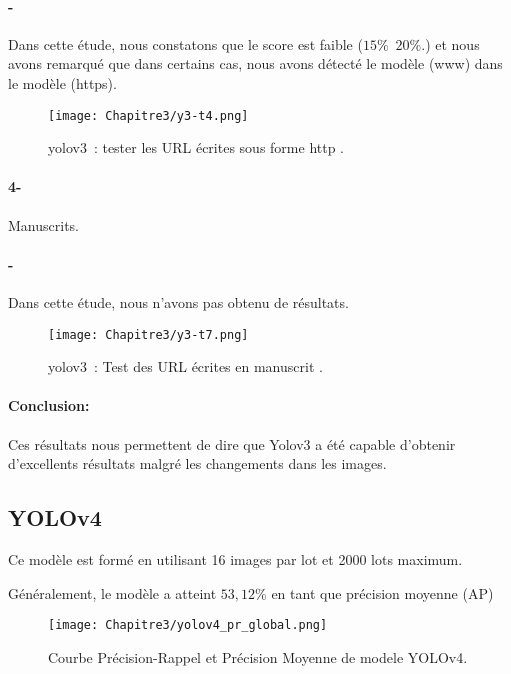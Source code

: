       \paragraph{-} Dans cette étude, nous constatons que le score est faible ($15\%$~$20\%$.) et nous avons remarqué que dans certains cas, nous avons détecté le modèle (www) dans le modèle (https).
      
      \begin{figure}[H]
          \centering
           \texttt{[image: Chapitre3/y3-t4.png]}
           \caption{yolov3 : tester les URL écrites sous forme http .}
           \label{y3_t4}
           \end{figure}


      \paragraph{4-} Manuscrits.
      \paragraph{-} Dans cette étude, nous n'avons pas obtenu de résultats.

      \begin{figure}[H]
          \centering
           \texttt{[image: Chapitre3/y3-t7.png]}
           \caption{yolov3 : Test des URL écrites en manuscrit .}
           \label{y3_t7}
           \end{figure}

      \paragraph{Conclusion:} Ces résultats nous permettent de dire que Yolov3 a été capable d'obtenir d'excellents résultats malgré les changements dans les images.     

     \subsection{YOLOv4}
     Ce modèle est formé en utilisant 16 images par lot et 2000 lots maximum.

     Généralement, le modèle a atteint $53,12\%$ en tant que précision moyenne (AP)
     \begin{figure}[H]
               \centering
               \texttt{[image: Chapitre3/yolov4\_pr\_global.png]}
               \caption{Courbe Précision-Rappel et Précision Moyenne de modele YOLOv4.}
               \label{y4_pr}
               \end{figure}
     

